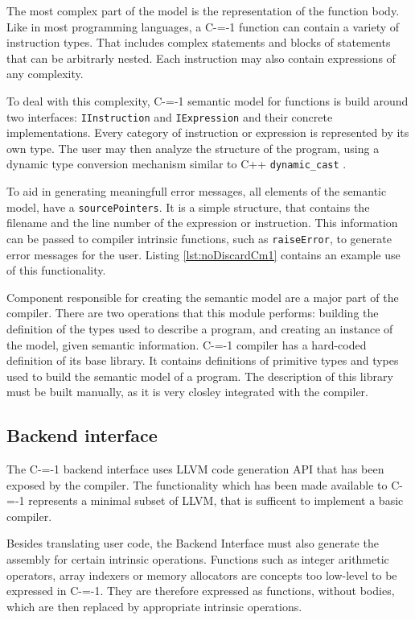 The most complex part of the model is the representation of the function body.
Like in most programming languages, a C-=-1 function can contain a variety of instruction types.
That includes complex statements and blocks of statements that can be arbitrarly nested.
Each instruction may also contain expressions of any complexity.

To deal with this complexity, C-=-1 semantic model for functions is build around two interfaces: \lstinline{IInstruction} and \lstinline{IExpression} and their concrete implementations.
Every category of instruction or expression is represented by its own type.
The user may then analyze the structure of the program, using a dynamic type conversion mechanism similar to C++ \lstinline{dynamic_cast} \cite{ISO:cpp98}.

To aid in generating meaningfull error messages, all elements of the semantic model, have a \lstinline{sourcePointers}.
It is a simple structure, that contains the filename and the line number of the expression or instruction.
This information can be passed to compiler intrinsic functions, such as \lstinline{raiseError}, to generate error messages for the user.
Listing \ref{lst:noDiscardCm1} contains an example use of this functionality.

Component responsible for creating the semantic model are a major part of the compiler.
There are two operations that this module performs: building the definition of the types used to describe a program, and creating an instance of the model, given semantic information.
C-=-1 compiler has a hard-coded definition of its base library.
It contains definitions of primitive types and types used to build the semantic model of a program.
The description of this library must be built manually, as it is very closley integrated with the compiler.

\subsection{Backend interface}
\label{implementation/backend-interface}

The C-=-1 backend interface uses LLVM \cite{llvmir} code generation API that has been exposed by the compiler.
The functionality which has been made available to C-=-1 represents a minimal subset of LLVM, that is sufficent to implement a basic compiler.

Besides translating user code, the Backend Interface must also generate the assembly for certain intrinsic operations.
Functions such as integer arithmetic operators, array indexers or memory allocators are concepts too low-level to be expressed in C-=-1.
They are therefore expressed as functions, without bodies, which are then replaced by appropriate intrinsic operations.


